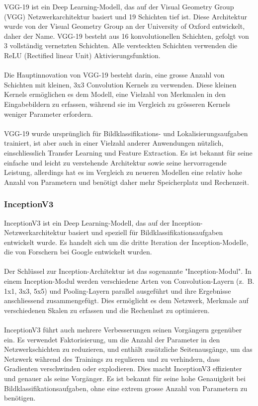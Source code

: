 \documentclass{article}
\begin{document}
VGG-19 \cite{simonyan_very_2015} ist ein Deep Learning-Modell, das auf der Visual Geometry Group (VGG) Netzwerkarchitektur basiert und 19 Schichten tief ist. Diese Architektur wurde von der Visual Geometry Group an der University of Oxford entwickelt, daher der Name. VGG-19 besteht aus 16 konvolutionellen Schichten, gefolgt von 3 vollständig vernetzten Schichten. Alle versteckten Schichten verwenden die ReLU (Rectified linear Unit) Aktivierungsfunktion.\\\\
Die Hauptinnovation von VGG-19 besteht darin, eine grosse Anzahl von Schichten mit kleinen, 3x3 Convolution Kernels zu verwenden. Diese kleinen Kernels ermöglichen es dem Modell, eine Vielzahl von Merkmalen in den Eingabebildern zu erfassen, während sie im Vergleich zu grösseren Kernels weniger Parameter erfordern.\\\\
VGG-19 wurde ursprünglich für Bildklassifikations- und Lokalisierungsaufgaben trainiert, ist aber auch in einer Vielzahl anderer Anwendungen nützlich, einschliesslich Transfer Learning und Feature Extraction. Es ist bekannt für seine einfache und leicht zu verstehende Architektur sowie seine hervorragende Leistung, allerdings hat es im Vergleich zu neueren Modellen eine relativ hohe Anzahl von Parametern und benötigt daher mehr Speicherplatz und Rechenzeit.

\subsubsection{InceptionV3}

InceptionV3 \cite{szegedy_rethinking_2015} ist ein Deep Learning-Modell, das auf der Inception-Netzwerkarchitektur basiert und speziell für Bildklassifikationsaufgaben entwickelt wurde. Es handelt sich um die dritte Iteration der Inception-Modelle, die von Forschern bei Google entwickelt wurden.\\\\
Der Schlüssel zur Inception-Architektur ist das sogenannte "Inception-Modul". In einem Inception-Modul werden verschiedene Arten von Convolution-Layern (z. B. 1x1, 3x3, 5x5) und Pooling-Layern parallel ausgeführt und ihre Ergebnisse anschliessend zusammengefügt. Dies ermöglicht es dem Netzwerk, Merkmale auf verschiedenen Skalen zu erfassen und die Rechenlast zu optimieren.\\\\
InceptionV3 führt auch mehrere Verbesserungen seinen Vorgängern gegenüber ein. Es verwendet Faktorisierung, um die Anzahl der Parameter in den Netzwerkschichten zu reduzieren, und enthält zusätzliche Seitenausgänge, um das Netzwerk während des Trainings zu regulieren und zu verhindern, dass Gradienten verschwinden oder explodieren. Dies macht InceptionV3 effizienter und genauer als seine Vorgänger. Es ist bekannt für seine hohe Genauigkeit bei Bildklassifikationsaufgaben, ohne eine extrem grosse Anzahl von Parametern zu benötigen.
\end{document}
